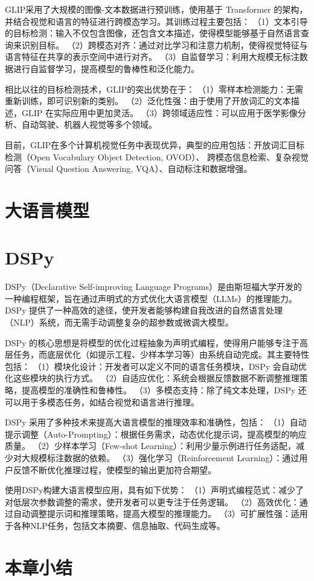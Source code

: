GLIP采用了大规模的图像-文本数据进行预训练，使用基于 Transformer 的架构，并结合视觉和语言的特征进行跨模态学习。其训练过程主要包括：
（1）文本引导的目标检测：输入不仅包含图像，还包含文本描述，使得模型能够基于自然语言查询来识别目标。
（2）跨模态对齐：通过对比学习和注意力机制，使得视觉特征与语言特征在共享的表示空间中进行对齐。
（3）自监督学习：利用大规模无标注数据进行自监督学习，提高模型的鲁棒性和泛化能力。

相比以往的目标检测技术，GLIP的突出优势在于：
（1）零样本检测能力：无需重新训练，即可识别新的类别。
（2）泛化性强：由于使用了开放词汇的文本描述，GLIP 在实际应用中更加灵活。
（3）跨领域适应性：可以应用于医学影像分析、自动驾驶、机器人视觉等多个领域。

目前，GLIP在多个计算机视觉任务中表现优异，典型的应用包括：开放词汇目标检测（Open Vocabulary Object Detection, OVOD）、
跨模态信息检索、复杂视觉问答（Visual Question Answering, VQA）、自动标注和数据增强。

\section{大语言模型}

\section{DSPy}
DSPy（Declarative Self-improving Language Programs）是由斯坦福大学开发的一种编程框架，旨在通过声明式的方式优化大语言模型（LLMs）的推理能力。DSPy 提供了一种高效的途径，使开发者能够构建自我改进的自然语言处理（NLP）系统，而无需手动调整复杂的超参数或微调大模型。

DSPy 的核心思想是将模型的优化过程抽象为声明式编程，使得用户能够专注于高层任务，而底层优化（如提示工程、少样本学习等）由系统自动完成。其主要特性包括：
（1）模块化设计：开发者可以定义不同的语言任务模块，DSPy 会自动优化这些模块的执行方式。
（2）自适应优化：系统会根据反馈数据不断调整推理策略，提高模型的准确性和鲁棒性。
（3）多模态支持：除了纯文本处理，DSPy 还可以用于多模态任务，如结合视觉和语言进行推理。

DSPy 采用了多种技术来提高大语言模型的推理效率和准确性，包括：
（1）自动提示调整（Auto-Prompting）：根据任务需求，动态优化提示词，提高模型的响应质量。
（2）少样本学习（Few-shot Learning）：利用少量示例进行任务适配，减少对大规模标注数据的依赖。
（3）强化学习（Reinforcement Learning）：通过用户反馈不断优化推理过程，使模型的输出更加符合期望。

使用DSPy构建大语言模型应用，具有如下优势：
（1）声明式编程范式：减少了对低层次参数调整的需求，使开发者可以更专注于任务逻辑。
（2）高效优化：通过自动调整提示词和推理策略，提高大模型的推理能力。
（3）可扩展性强：适用于各种NLP任务，包括文本摘要、信息抽取、代码生成等。

\section{本章小结}